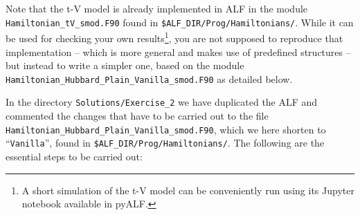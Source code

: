 \documentclass[10pt,modern]{scrartcl}
\numberwithin{exerciseitem}{exercise} %
\begin{document}
Note that the t-V model is already implemented in ALF in the module \texttt{Hamiltonian\_tV\_smod.F90} found in  \texttt{\$ALF\_DIR/Prog/Hamiltonians/}. While it can be used for checking your own results\footnote{A short simulation of the t-V model can be conveniently run using its Jupyter notebook available in pyALF.}, you are not supposed to reproduce that implementation -- which is more general and makes use of predefined structures -- but instead to write a simpler one, based on the module \texttt{Hamiltonian\_Hubbard\_Plain\_Vanilla\_smod.F90} as detailed below.



In the directory  \texttt{Solutions/Exercise\_2} we have  duplicated the ALF and commented  the changes that have to be carried out to the file \texttt{Hamiltonian\_Hubbard\_Plain\_Vanilla\_smod.F90}, which we here shorten to ``\texttt{Vanilla}'', found in \texttt{\$ALF\_DIR/Prog/Hamiltonians/}. The following are the essential steps to be carried out:
\end{document}
